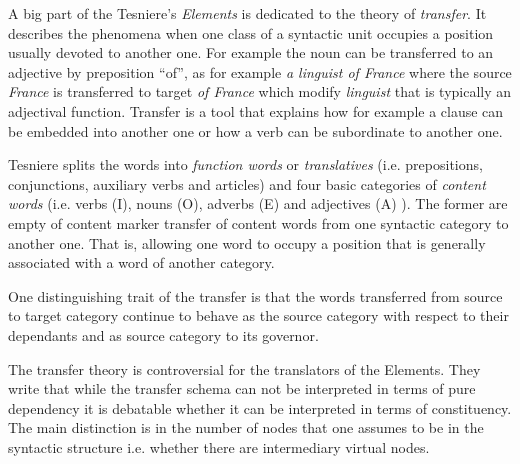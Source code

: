 A big part of the Tesniere's \textit{Elements} \citep{Tesniere59} is dedicated to the theory of \textit{transfer}. It describes the phenomena when one class of a syntactic unit occupies a position usually devoted to another one. For example the noun can be transferred to an adjective by preposition ``of'', as for example \textit{a linguist of France} where the source \textit{France} is transferred to target \textit{of France} which modify \textit{linguist} that is typically an adjectival function. Transfer is a tool that explains how for example a clause can be embedded into another one or how a verb can be subordinate to another one. 

Tesniere splits the words into \textit{function words} or \textit{translatives} (i.e. prepositions, conjunctions, auxiliary verbs and articles) and four basic categories of \textit{content words} (i.e. verbs (I), nouns (O), adverbs (E) and adjectives (A) ). The former are empty of content marker transfer of content words from one syntactic category to another one. That is, allowing one word to occupy a position that is generally associated with a word of another category. 

One distinguishing trait of the transfer is that the words transferred from source to target category continue to behave as the source category with respect to their dependants and as source category to its governor.

The transfer theory is controversial for the translators of the Elements. They write \citep[liv-lx]{Tesniere2015} that while the transfer schema can not be interpreted in terms of pure dependency it is debatable whether it can be interpreted in terms of constituency. The main distinction is in the number of nodes that one assumes to be in the syntactic structure i.e. whether there are intermediary virtual nodes. 

